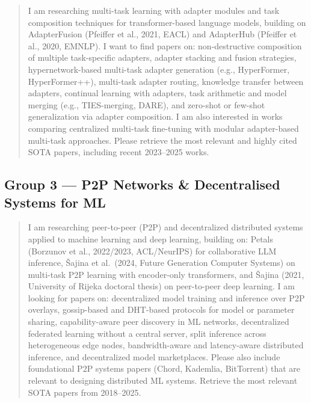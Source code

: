 \begin{quote}\small
I am researching multi-task learning with adapter modules and task composition
techniques for transformer-based language models, building on AdapterFusion (Pfeiffer
et al., 2021, EACL) and AdapterHub (Pfeiffer et al., 2020, EMNLP). I want to find
papers on: non-destructive composition of multiple task-specific adapters, adapter
stacking and fusion strategies, hypernetwork-based multi-task adapter generation
(e.g., HyperFormer, HyperFormer++), multi-task adapter routing, knowledge transfer
between adapters, continual learning with adapters, task arithmetic and model merging
(e.g., TIES-merging, DARE), and zero-shot or few-shot generalization via adapter
composition. I am also interested in works comparing centralized multi-task
fine-tuning with modular adapter-based multi-task approaches. Please retrieve the
most relevant and highly cited SOTA papers, including recent 2023--2025 works.
\end{quote}

\subsection*{Group 3 — P2P Networks \& Decentralised Systems for ML}
\label{app:undermind:g3}

\begin{quote}\small
I am researching peer-to-peer (P2P) and decentralized distributed systems applied to
machine learning and deep learning, building on: Petals (Borzunov et al., 2022/2023,
ACL/NeurIPS) for collaborative LLM inference, \v{S}ajina et al.\ (2024, Future
Generation Computer Systems) on multi-task P2P learning with encoder-only
transformers, and \v{S}ajina (2021, University of Rijeka doctoral thesis) on
peer-to-peer deep learning. I am looking for papers on: decentralized model training
and inference over P2P overlays, gossip-based and DHT-based protocols for model or
parameter sharing, capability-aware peer discovery in ML networks, decentralized
federated learning without a central server, split inference across heterogeneous edge
nodes, bandwidth-aware and latency-aware distributed inference, and decentralized
model marketplaces. Please also include foundational P2P systems papers (Chord,
Kademlia, BitTorrent) that are relevant to designing distributed ML systems. Retrieve
the most relevant SOTA papers from 2018--2025.
\end{quote}

